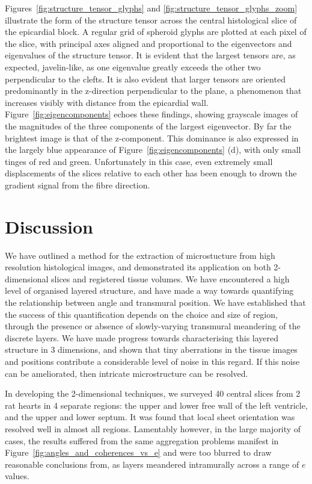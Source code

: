     Figures~\ref{fig:structure_tensor_glyphs} and \ref{fig:structure_tensor_glyphs_zoom} illustrate the form of the structure tensor across the central histological slice of the epicardial block. A regular grid of spheroid glyphs are plotted at each pixel of the slice, with principal axes aligned and proportional to the eigenvectors and eigenvalues of the structure tensor. It is evident that the largest tensors are, as expected, javelin-like, as one eigenvalue greatly exceeds the other two perpendicular to the clefts. It is also evident that larger tensors are oriented predominantly in the z-direction perpendicular to the plane, a phenomenon that increases visibly with distance from the epicardial wall. Figure~\ref{fig:eigencomponents} echoes these findings, showing grayscale images of the magnitudes of the three components of the largest eigenvector. By far the brightest image is that of the z-component. This dominance is also expressed in the largely blue appearance of Figure~\ref{fig:eigencomponents} (d), with only small tinges of red and green. Unfortunately in this case, even extremely small displacements of the slices relative to each other has been enough to drown the gradient signal from the fibre direction.
  

\section{Discussion} %
  We have outlined a method for the extraction of microstucture from high resolution histological images, and demonstrated its application on both 2-dimensional slices and registered tissue volumes. We have encountered a high level of organised layered structure, and have made a way towards quantifying the relationship between angle and transmural position. We have established that the success of this quantification depends on the choice and size of region, through the presence or absence of slowly-varying transmural meandering of the discrete layers. We have made progress towards characterising this layered structure in 3 dimensions, and shown that tiny aberrations in the tissue images and positions contribute a considerable level of noise in this regard. If this noise can be ameliorated, then intricate microstructure can be resolved.
  
  In developing the 2-dimensional techniques, we surveyed 40 central slices from 2 rat hearts in 4 separate regions: the upper and lower free wall of the left ventricle, and the upper and lower septum. It was found that local sheet orientation was resolved well in almost all regions. Lamentably however, in the large majority of cases, the results suffered from the same aggregation problems manifest in Figure~\ref{fig:angles_and_coherences_vs_e} and were too blurred to draw reasonable conclusions from, as layers meandered intramurally across a range of $e$ values.
  
